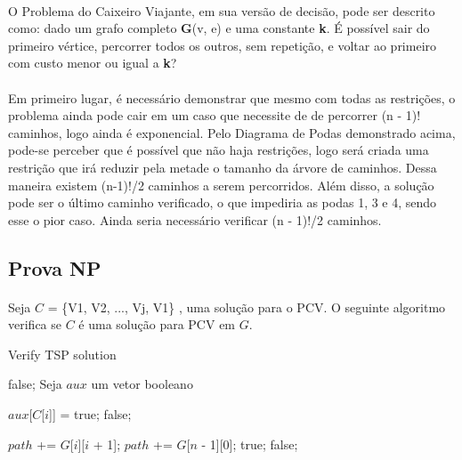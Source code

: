 \documentclass[a4paper, 12pt]{article}
\begin{document}
\paragraph{}
O Problema do Caixeiro Viajante, em sua versão de decisão, pode ser descrito como: dado um grafo completo \textbf{G}(v, e) e uma constante \textbf{k}. É possível sair do primeiro vértice, percorrer todos os outros, sem repetição, e voltar ao primeiro com custo menor ou igual a \textbf{k}?
\paragraph{}
Em primeiro lugar, é necessário demonstrar que mesmo com todas as restrições, o problema ainda pode cair em um caso que necessite de de percorrer (n - 1)! caminhos, logo ainda é exponencial. Pelo Diagrama de Podas demonstrado acima, pode-se perceber que é possível que não haja restrições, logo será criada uma restrição que irá reduzir pela metade o tamanho da árvore de caminhos. Dessa maneira existem (n-1)!/2 caminhos a serem percorridos. Além disso, a solução pode ser o último caminho verificado, o que impediria as podas 1, 3 e 4, sendo esse o pior caso. Ainda seria necessário verificar (n - 1)!/2 caminhos.


\subsection{Prova NP}
\paragraph{}
Seja $C$ = \{V1, V2, ..., Vj, V1\} , uma solução para o PCV. O seguinte algoritmo verifica se $C$ é uma solução para PCV em $G$.

\begin{algorithm}
\caption{Verify TSP solution}
\begin{algorithmic}
	\State {}    
		\State \Return false;    
    \EndIf
    \State {}
	\State Seja $aux$ um vetor booleano
	
			\State $aux$[$C$[$i$]] = true;	
		\Else
			\State \Return false;
		\EndIf    
    \EndFor
    
    \State {}
		\State $path$ += $G$[$i$][$i$ + 1];		
    \EndFor
    \State $path$ += $G$[$n$ - 1][0];
			\State \Return true;	
		\Else
			\State \Return false;
			\EndIf
\EndFunction
\end{algorithmic}
\end{algorithm}
\end{document}

